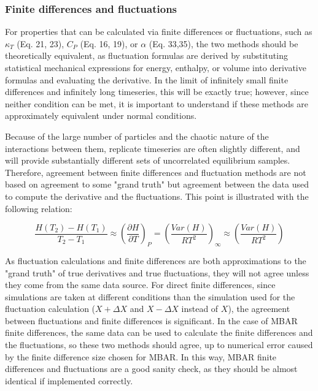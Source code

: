 \documentclass[9pt,bestpractices]{livecoms}
\begin{document}
\subsubsection{Finite differences and fluctuations}

For properties that can be calculated via finite differences or fluctuations, such as $\kappa_T$ (Eq. 21, 23), $C_P$ (Eq. 16, 19), or $\alpha$ (Eq. 33,35), the two methods should be theoretically equivalent, as fluctuation formulas are derived by substituting statistical mechanical expressions for energy, enthalpy, or volume into derivative formulas and evaluating the derivative.  In the limit of infinitely small finite differences and infinitely long timeseries, this will be exactly true; however, since neither condition can be met, it is important to understand if these methods are approximately equivalent under normal conditions.

Because of the large number of particles and the chaotic nature of the interactions between them, replicate timeseries are often slightly different, and will provide substantially different sets of uncorrelated equilibrium samples.  Therefore, agreement between finite differences and fluctuation methods are not based on agreement to some "grand truth" but agreement between the data used to compute the derivative and the fluctuations. This point is illustrated with the following relation:

\begin{equation}
\frac{H(T_2)-H(T_1)}{T_2-T_1} \approx \left(\frac{\partial H}{\partial T}\right)_P = \left(\frac{Var(H)}{RT^2}\right)_{\infty} \approx \left(\frac{Var(H)}{RT^2}\right)
\end{equation}

As fluctuation calculations and finite differences are both approximations to the "grand truth" of true derivatives and true fluctuations, they will not agree unless they come from the same data source.  For direct finite differences, since simulations are taken at different conditions than the simulation used for the fluctuation calculation ($X+\Delta X$ and $X-\Delta X$ instead of $X$), the agreement between fluctuations and finite differences is significant.  In the case of MBAR finite differences, the same data can be used to calculate the finite differences and the fluctuations, so these two methods should agree, up to numerical error caused by the finite difference size chosen for MBAR.  In this way, MBAR finite differences and fluctuations are a good sanity check, as they should be almost identical if implemented correctly.
\end{document}
